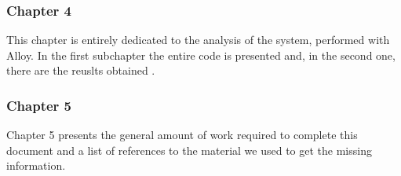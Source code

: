 \begin{flushleft}
\paragraph{}

{\color{Blue}\subsubsection{Chapter 4}}
This chapter is entirely dedicated to the analysis of the system, performed with Alloy. In the first subchapter the entire code is presented and, in the second one, there are the reuslts obtained . \par
\paragraph{}

{\color{Blue}\subsubsection{Chapter 5}}
Chapter 5 presents the general amount of work required to complete this document and a list of references to the material we used to get the missing information.\par
\paragraph{}

\end{flushleft}